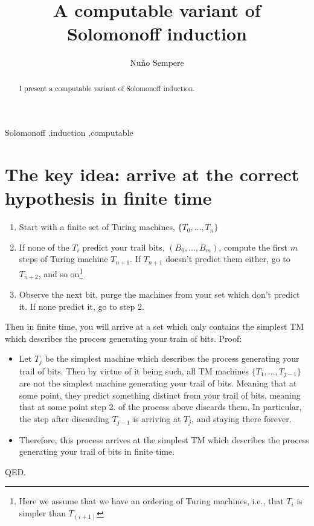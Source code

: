 \documentclass[12pt,authoryear]{elsarticle}
\begin{document}
\begin{frontmatter}


\title{A computable variant of Solomonoff induction}


\author[1]{Nu\~{n}o Sempere}

\address[1]{Quantified Uncertainty Research Institute, Mexico}

\begin{abstract}
	I present a computable variant of Solomonoff induction.
\end{abstract}

\begin{keyword}
Solomonoff \sep induction \sep computable
\end{keyword}

\end{frontmatter}

\section{The key idea: arrive at the correct hypothesis in finite time}

\begin{enumerate}
	\item Start with a finite set of Turing machines, $\{T_0, ..., T_n\}$
	\item If none of the $T_i$ predict your trail bits, $(B_0, ..., B_m)$, compute the first $m$ steps of Turing machine $T_{n+1}$. If $T_{n+1}$ doesn't predict them either, go to $T_{n+2}$, and so on\footnote{Here we assume that we have an ordering of Turing machines, i.e., that $T_i$ is simpler than $T_{(i+1)}$}
	\item Observe the next bit, purge the machines from your set which don't predict it. If none predict it, go to step 2.
\end{enumerate}


Then in finite time, you will arrive at a set which only contains the simplest TM which describes the process generating your train of bits. Proof:

\begin{itemize}
	\item Let $T_j$ be the simplest machine which describes the process generating your trail of bits. Then by virtue of it being such, all TM machines $\{T_1,...,T_{j-1}\}$ are not the simplest machine generating your trail of bits. Meaning that at some point, they predict something distinct from your trail of bits, meaning that at some point step 2. of the process above discards them. In particular, the step after discarding $T_{j-1}$ is arriving at $T_j$, and staying there forever.
  \item Therefore, this process arrives at the simplest TM which describes the process generating your trail of bits in finite time.
\end{itemize}
QED. 
\end{document}
